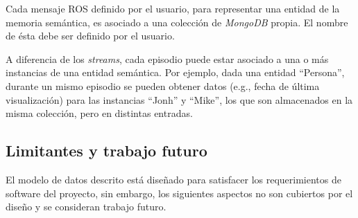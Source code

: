 Cada mensaje ROS definido por el usuario, para representar una entidad de la memoria semántica, es  asociado a una colección de \textit{MongoDB} propia. El nombre de ésta debe ser definido por el usuario. 

A diferencia de los \textit{streams}, cada episodio puede estar asociado a una o más instancias de una entidad semántica. Por ejemplo, dada una entidad ``Persona'', durante un mismo episodio se pueden obtener datos (e.g., fecha de última visualización) para las instancias ``Jonh'' y ``Mike'', los que son almacenados en la misma colección, pero en distintas entradas.







\subsection{Limitantes y trabajo futuro}

El modelo de datos descrito está diseñado para satisfacer los requerimientos de software del proyecto, sin embargo, los siguientes aspectos no son cubiertos por el diseño y se consideran trabajo futuro.





